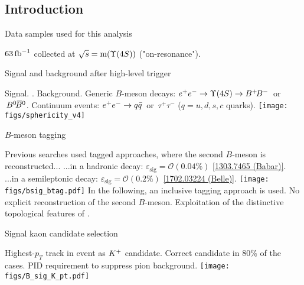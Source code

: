 \subsection{Introduction}
\begin{frame}{Data samples used for this analysis}
\bi
\item  {$63\mbox{\,fb}^{-1}$ collected at $\sqrt{s}=\mathrm{m}(\Y4S)$ ("on-resonance").} 
\ei
\end{frame}
\begin{frame}{Signal and background after high-level trigger}
\bi
\item Signal.
\bi
{}.
\ei
\itemii Background.
\bi
\itemii Generic $B$-meson decays: $\epem\to\Y4S\to\BpBm\,$ or $\,\BzBzb$.
\itemii Continuum events: $e^+e^-\rightarrow q\bar{q}\,$ or $\,\tau^{+}\tau^{-}$ ($q=u,d,s,c$ quarks). 
\ei
\ei
\vspace{0.5cm}
\centering
\texttt{[image: figs/sphericity\_v4]}
\end{frame}
\begin{frame}{$B$-meson tagging}
\bi
\item Previous searches used tagged approaches, where the second $B$-meson is reconstructed...
\bi
\itemiii ...in a hadronic decay: $\varepsilon_{\mathrm{sig}}=\mathcal{O}(0.04\%)$ \hfill \href{https://arxiv.org/abs/1303.7465v2}{\color{blue!40!gray} [1303.7465 (Babar)]}.
\itemiii ...in a semileptonic decay: $\varepsilon_{\mathrm{sig}}=\mathcal{O}(0.2\%)$ \hfill \href{https://arxiv.org/abs/1702.03224}{\color{blue!40!gray} [1702.03224 (Belle)]}.
\ei
\ei
\vspace{0.25cm}
\centering
\texttt{[image: figs/bsig\_btag.pdf]}
\bi
\itemi In the following, an inclusive tagging approach is used.
\bi
\itemiii No explicit reconstruction of the second $B$-meson.
\itemiii Exploitation of the distinctive topological features of \BKnn.
\ei
\ei
\end{frame}
\begin{frame}{Signal kaon candidate selection}
\bi
\item Highest-$p_T$ track in event as $K^+$ candidate.
\bi
\itemii Correct candidate in 80\% of the cases.
\itemii PID requirement to suppress pion background.
\ei
\ei
\vspace{0.5cm}
\centering
\texttt{[image: figs/B\_sig\_K\_pt.pdf]}
\end{frame}
